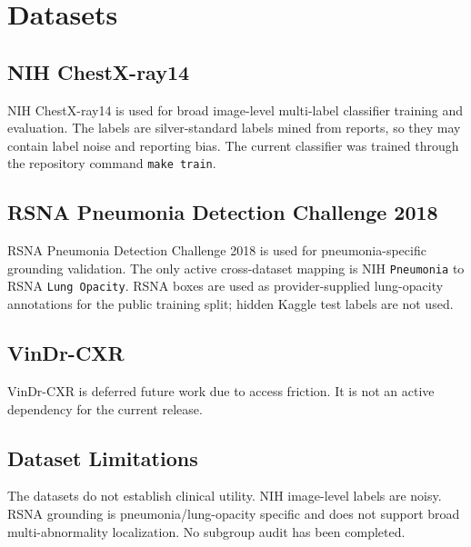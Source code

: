 \section{Datasets}

\subsection{NIH ChestX-ray14}

NIH ChestX-ray14 \citep{wang2017chestxray8} is used for broad image-level multi-label classifier training and evaluation. The labels are silver-standard labels mined from reports, so they may contain label noise and reporting bias. The current classifier was trained through the repository command \texttt{make train}.

\subsection{RSNA Pneumonia Detection Challenge 2018}

RSNA Pneumonia Detection Challenge 2018 is used for pneumonia-specific grounding validation. The only active cross-dataset mapping is NIH \texttt{Pneumonia} to RSNA \texttt{Lung Opacity}. RSNA boxes are used as provider-supplied lung-opacity annotations for the public training split; hidden Kaggle test labels are not used.

\subsection{VinDr-CXR}

VinDr-CXR is deferred future work due to access friction. It is not an active dependency for the current release.

\subsection{Dataset Limitations}

The datasets do not establish clinical utility. NIH image-level labels are noisy. RSNA grounding is pneumonia/lung-opacity specific and does not support broad multi-abnormality localization. No subgroup audit has been completed.
